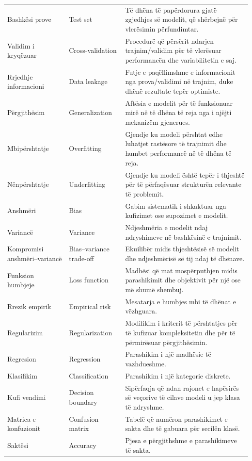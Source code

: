 \documentclass[12pt,a4paper,oneside]{book}
\begin{document}
\begin{longtable}{p{}p{}p{}}
Bashkësi prove & Test set & Të dhëna të papërdorura gjatë zgjedhjes së modelit, që shërbejnë për vlerësimin përfundimtar.\\
Validim i kryqëzuar & Cross-validation & Procedurë që përsërit ndarjen trajnim/validim për të vlerësuar performancën dhe variabilitetin e saj.\\
Rrjedhje informacioni & Data leakage & Futje e paqëllimshme e informacionit nga prova/validimi në trajnim, duke dhënë rezultate tepër optimiste.\\
Përgjithësim & Generalization & Aftësia e modelit për të funksionuar mirë në të dhëna të reja nga i njëjti mekanizëm gjenerues.\\
Mbipërshtatje & Overfitting & Gjendje ku modeli përshtat edhe luhatjet rastësore të trajnimit dhe humbet performancë në të dhëna të reja.\\
Nënpërshtatje & Underfitting & Gjendje ku modeli është tepër i thjeshtë për të përfaqësuar strukturën relevante të problemit.\\
Anshmëri & Bias & Gabim sistematik i shkaktuar nga kufizimet ose supozimet e modelit.\\
Variancë & Variance & Ndjeshmëria e modelit ndaj ndryshimeve në bashkësinë e trajnimit.\\
Kompromisi anshmëri--variancë & Bias--variance trade-off & Ekuilibër midis thjeshtësisë së modelit dhe ndjeshmërisë së tij ndaj të dhënave.\\
Funksion humbjeje & Loss function & Madhësi që mat mospërputhjen midis parashikimit dhe objektivit për një ose më shumë shembuj.\\
Rrezik empirik & Empirical risk & Mesatarja e humbjes mbi të dhënat e vëzhguara.\\
Regularizim & Regularization & Modifikim i kriterit të përshtatjes për të kufizuar kompleksitetin dhe për të përmirësuar përgjithësimin.\\
Regresion & Regression & Parashikim i një madhësie të vazhdueshme.\\
Klasifikim & Classification & Parashikim i një kategorie diskrete.\\
Kufi vendimi & Decision boundary & Sipërfaqja që ndan rajonet e hapësirës së veçorive të cilave modeli u jep klasa të ndryshme.\\
Matrica e konfuzionit & Confusion matrix & Tabelë që numëron parashikimet e sakta dhe të gabuara për secilën klasë.\\
Saktësi & Accuracy & Pjesa e përgjithshme e parashikimeve të sakta.\\

\end{longtable}
\end{document}
